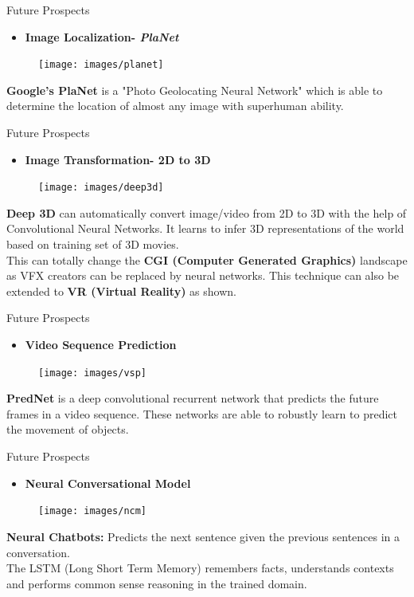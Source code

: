 \documentclass[10pt]{beamer}
\begin{document}
	\begin{frame}[c]{Future Prospects}
		\begin{itemize}
			\item \large{\textbf{Image Localization- \textit{PlaNet}}}
		\end{itemize}
		\begin{figure}
			\texttt{[image: images/planet]}
		\end{figure}
		\textbf{Google's PlaNet} is a "Photo Geolocating Neural Network" which is able to \alert{determine the location of almost any image} with superhuman ability.
	\end{frame}
	\begin{frame}[c]{Future Prospects}
		\begin{itemize}
			\item \large{\textbf{Image Transformation- 2D to 3D}}
		\end{itemize}
		\begin{figure}
			\texttt{[image: images/deep3d]}
		\end{figure}
		\textbf{Deep 3D} \alert{can automatically convert image/video from 2D to 3D} with the help of Convolutional Neural Networks. It learns to infer 3D representations of the world based on training set of 3D movies.
		\\
		This can totally change the \textbf{CGI (Computer Generated Graphics)} landscape as VFX creators can be replaced by neural networks. This technique can also be extended to \textbf{VR (Virtual Reality)} as shown.
	\end{frame}
	\begin{frame}[c]{Future Prospects}
		\begin{itemize}
			\item \large{\textbf{Video Sequence Prediction}}
		\end{itemize}
		\begin{figure}
			\texttt{[image: images/vsp]}
		\end{figure}
		\textbf{PredNet} is a deep convolutional recurrent network that \alert{predicts the future frames in a video sequence}. These networks are able to robustly learn to predict the movement of objects.
	\end{frame}
	\begin{frame}[c]{Future Prospects}
		\begin{itemize}
			\item \large{\textbf{Neural Conversational Model}}
		\end{itemize}
		\begin{figure}
			\texttt{[image: images/ncm]}
		\end{figure}
		\textbf{Neural Chatbots:} \alert{Predicts the next sentence} given the previous sentences in a conversation.\\
		The LSTM (Long Short Term Memory) remembers facts, understands contexts and performs common sense reasoning in the trained domain.
	\end{frame}
\end{document}
